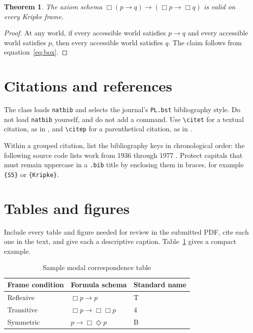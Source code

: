 \documentclass{PL}
\newtheorem{theorem}{Theorem}[section]
\theoremstyle{definition}
\begin{document}
\begin{theorem}\label{thm:k-valid}
The axiom schema $\Box(p\rightarrow q)\rightarrow(\Box p\rightarrow\Box q)$ is valid on every Kripke frame.
\end{theorem}

\begin{proof}
At any world, if every accessible world satisfies $p\rightarrow q$ and every accessible world satisfies $p$, then every accessible world satisfies $q$. The claim follows from equation~\eqref{eq:box}.
\end{proof}

\section{Citations and references}

The class loads \texttt{natbib} and selects the journal's \texttt{PL.bst} bibliography style. Do not load \texttt{natbib} yourself, and do not add a \verb|| command. Use \verb|\citet| for a textual citation, as in \citet{marcus:1961}, and \verb|\citep| for a parenthetical citation, as in \citep{haack:1976}.

Within a grouped citation, list the bibliography keys in chronological order: the following source code lists work from 1936 through 1977 \citep{tarski:1936,marcus:1961,kripke:1963,lewis:1973,haack:1976,fischer-servi:1977}. Protect capitals that must remain uppercase in a \texttt{.bib} title by enclosing them in braces, for example \verb|{S5}| or \verb|{Kripke}|.

\section{Tables and figures}

Include every table and figure needed for review in the submitted PDF, cite each one in the text, and give each a descriptive caption. Table~\ref{tab:correspondence} gives a compact example.

\begin{table}[tb]
  \centering
  \begin{tabular}{lll}
    \toprule
    Frame condition & Formula schema & Standard name \\
    \midrule
    Reflexive  & $\Box p\rightarrow p$                  & T \\
    Transitive & $\Box p\rightarrow\Box\Box p$         & 4 \\
    Symmetric  & $p\rightarrow\Box\Diamond p$          & B \\
    \bottomrule
  \end{tabular}
  \caption{Sample modal correspondence table}%
  \label{tab:correspondence}
\end{table}
\end{document}

